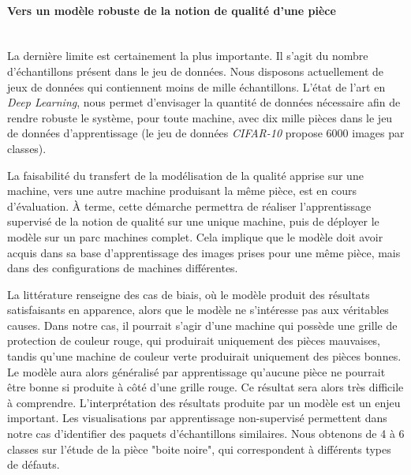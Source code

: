 \paragraph{Vers un modèle robuste de la notion de qualité d'une pièce} \mbox{} \\
La dernière limite est certainement la plus importante.
Il s'agit du nombre d'échantillons présent dans le jeu de données.
Nous disposons actuellement de jeux de données qui contiennent moins de mille échantillons.
L’état de l’art en \textit{Deep Learning}, nous permet d’envisager la quantité de données nécessaire afin de rendre robuste le système, pour toute machine, avec dix mille pièces dans le jeu de données d’apprentissage (le jeu de données \textit{CIFAR-10} \cite{krizhevsky2009learning} propose 6000 images par classes).

La faisabilité du transfert de la modélisation de la qualité apprise sur une machine, vers une autre machine produisant la même pièce, est en cours d’évaluation.
À terme, cette démarche permettra de réaliser l’apprentissage supervisé de la notion de qualité sur une unique machine, puis de déployer le modèle sur un parc machines complet.
Cela implique que le modèle doit avoir acquis dans sa base d’apprentissage des images prises pour une même pièce, mais dans des configurations de machines différentes.

La littérature renseigne des cas de biais, où le modèle produit des résultats satisfaisants en apparence, alors que le modèle ne s’intéresse pas aux véritables causes.
Dans notre cas, il pourrait s'agir d'une machine qui possède une grille de protection de couleur rouge, qui produirait uniquement des pièces mauvaises, tandis qu’une machine de couleur verte produirait uniquement des pièces bonnes.
Le modèle aura alors généralisé par apprentissage qu’aucune pièce ne pourrait être bonne si produite à côté d’une grille rouge.
Ce résultat sera alors très difficile à comprendre.
L'interprétation des résultats produite par un modèle est un enjeu important.
Les visualisations par apprentissage non-supervisé permettent dans notre cas d'identifier des paquets d'échantillons similaires.
Nous obtenons de 4 à 6 classes sur l'étude de la pièce "boite noire", qui correspondent à différents types de défauts.

